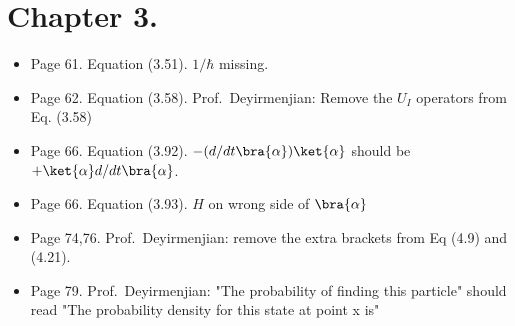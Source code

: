 \section{Chapter 3.}
\begin{itemize}
\item Page 61.  Equation (3.51).  $1/\hbar$ missing.
\item Page 62.  Equation (3.58).  Prof.\ Deyirmenjian: Remove the $U_I$ operators from Eq. (3.58)
\item Page 66.  Equation (3.92).  $-(d/dt \bra{\alpha}) \ket{\alpha}$ should be $+\ket{\alpha} d/dt \bra{\alpha}$.
\item Page 66.  Equation (3.93).  $H$ on wrong side of $\bra{\alpha}$ 
\item Page 74,76.  Prof.\ Deyirmenjian: remove the extra brackets from Eq (4.9) and (4.21).
\item Page 79.  Prof.\ Deyirmenjian: "The probability of finding this particle" should read "The probability density for this state at point x is"
\end{itemize}

